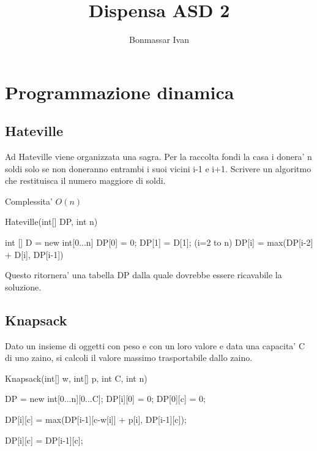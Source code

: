 \documentclass[oneside]{book}
\title {Dispensa ASD 2}
\author{Bonmassar Ivan}
\begin{document}
\maketitle
\tableofcontents


\chapter{Programmazione dinamica}
\section{Hateville}

Ad Hateville viene organizzata una sagra. Per la raccolta fondi la casa i donera' n soldi solo se non doneranno entrambi i suoi vicini i-1 e i+1. Scrivere un algoritmo che restituisca il numero maggiore di soldi.

Complessita' $O(n)$
\begin{algorithmic}
\begin{algorithm}
\caption{Hateville(int[] DP, int n)}\label{alg:cap}

\State int [] D = new int[0...n]
\State DP[0] = 0;
\State DP[1] = D[1];
\For (i=2 to n)
	\State DP[i] = max(DP[i-2] + D[i], DP[i-1])
\EndFor

\end{algorithm}
\end{algorithmic}
Questo ritornera' una tabella DP dalla quale dovrebbe essere ricavabile la soluzione.

\newpage
\section{Knapsack}
Dato un insieme di oggetti con peso e con un loro valore e data una capacita' C di uno zaino, si calcoli il valore massimo trasportabile dallo zaino.

\begin{algorithm}
\caption{Knapsack(int[] w, int[] p, int C, int n)}\label{alg:cap}
\begin{algorithmic}
\State 	DP = new int[0...n][0...C];
	\State DP[i][0] = 0;
\EndFor
{}
\State DP[0][c] = 0;
\EndFor

			\State DP[i][c] = max(DP[i-1][c-w[i]] + p[i], DP[i-1][c]);
		
		\Else 	
			\State DP[i][c] = DP[i-1][c];	
		\EndIf
		
	\EndFor
\EndFor	

\end{algorithmic}
\end{algorithm}
\end{document}
